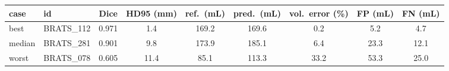 \begin{tabular}{llccccccc}
\toprule
case & id & Dice & HD95 (mm) & ref.\ (mL) & pred.\ (mL) & vol.\ error (\%) & FP (mL) & FN (mL) \\
\midrule
best & BRATS\_112 & 0.971 & 1.4 & 169.2 & 169.6 & 0.2 & 5.2 & 4.7 \\
median & BRATS\_281 & 0.901 & 9.8 & 173.9 & 185.1 & 6.4 & 23.3 & 12.1 \\
worst & BRATS\_078 & 0.605 & 11.4 & 85.1 & 113.3 & 33.2 & 53.3 & 25.0 \\
\bottomrule
\end{tabular}
